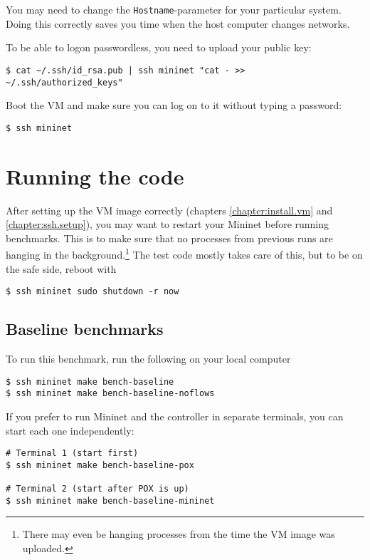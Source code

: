 You may need to change the \texttt{Hostname}-parameter for your particular
system.  Doing this correctly saves you time when the host computer changes
networks.

To be able to logon passwordless, you need to upload your public key:

\begin{verbatim}
$ cat ~/.ssh/id_rsa.pub | ssh mininet "cat - >> ~/.ssh/authorized_keys"
\end{verbatim}

Boot the VM and make sure you can log on to it without typing a password:

\begin{verbatim}
$ ssh mininet
\end{verbatim}



\section{Running the code}
\label{chapter:appendix.benchmark}

After setting up the VM image correctly (chapters \ref{chapter:install.vm}
and \ref{chapter:ssh.setup}), you may want to restart your Mininet
before running benchmarks.  This is to make sure that no processes from
previous runs are hanging in the background.\footnote{There may even be
hanging processes from the time the VM image was uploaded.} The test code
mostly takes care of this, but to be on the safe side, reboot with

\begin{Verbatim}
$ ssh mininet sudo shutdown -r now
\end{Verbatim}

\subsection{Baseline benchmarks}
\label{chapter:appendix.baseline.benchmark}

To run this benchmark, run the following on your local computer

\begin{Verbatim}
$ ssh mininet make bench-baseline
$ ssh mininet make bench-baseline-noflows
\end{Verbatim}

If you prefer to run Mininet and the controller in separate terminals, you
can start each one independently:

\begin{Verbatim}
# Terminal 1 (start first)
$ ssh mininet make bench-baseline-pox

# Terminal 2 (start after POX is up)
$ ssh mininet make bench-baseline-mininet
\end{Verbatim}

